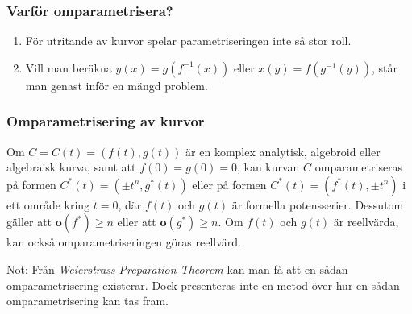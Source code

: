 \documentclass{beamer}
\begin{document}
\begin{frame}
	\frametitle{Varför omparametrisera?}
	\begin{enumerate}
		\item För utritande av kurvor spelar parametriseringen inte så stor roll.
		
		\item Vill man beräkna $y(x) = g(f^{-1}(x))$ eller $x(y) = f(g^{-1}(y))$, står man genast inför en mängd problem.
	\end{enumerate}
\end{frame}

\begin{frame}
	\frametitle{Omparametrisering av kurvor}
\begin{Theorem}
	Om $C = C(t) = \left(f(t), g(t)\right)$ är en komplex analytisk, algebroid eller algebraisk kurva, samt att $f(0) = g(0) = 0$, kan kurvan $C$ omparametriseras på formen $C^*(t) = \left(\pm t^n, g^*(t)\right)$ eller på formen $C^*(t) = \left(f^*(t), \pm t^n \right)$ i ett område kring $t = 0$, där $f(t)$ och $g(t)$ är formella potensserier. Dessutom gäller att $\mathbf{o}\left(f^*\right) \geq n$ eller att $\mathbf{o}\left(g^*\right) \geq n$. Om $f(t)$ och $g(t)$ är reellvärda, kan också omparametriseringen göras reellvärd.
\end{Theorem}

\vspace{20pt}
\scriptsize Not: Från \emph{Weierstrass Preparation Theorem} kan man få att en sådan omparametrisering existerar. Dock presenteras inte en metod över hur en sådan omparametrisering kan tas fram.
\end{frame}
\end{document}
